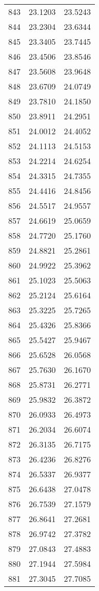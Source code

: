 \documentclass{article}
\begin{document}
\begin{longtable}{|c|c|c|}
843 & 23.1203 & 23.5243 \\
844 & 23.2304 & 23.6344 \\
845 & 23.3405 & 23.7445 \\
846 & 23.4506 & 23.8546 \\
847 & 23.5608 & 23.9648 \\
848 & 23.6709 & 24.0749 \\
849 & 23.7810 & 24.1850 \\
850 & 23.8911 & 24.2951 \\
851 & 24.0012 & 24.4052 \\
852 & 24.1113 & 24.5153 \\
853 & 24.2214 & 24.6254 \\
854 & 24.3315 & 24.7355 \\
855 & 24.4416 & 24.8456 \\
856 & 24.5517 & 24.9557 \\
857 & 24.6619 & 25.0659 \\
858 & 24.7720 & 25.1760 \\
859 & 24.8821 & 25.2861 \\
860 & 24.9922 & 25.3962 \\
861 & 25.1023 & 25.5063 \\
862 & 25.2124 & 25.6164 \\
863 & 25.3225 & 25.7265 \\
864 & 25.4326 & 25.8366 \\
865 & 25.5427 & 25.9467 \\
866 & 25.6528 & 26.0568 \\
867 & 25.7630 & 26.1670 \\
868 & 25.8731 & 26.2771 \\
869 & 25.9832 & 26.3872 \\
870 & 26.0933 & 26.4973 \\
871 & 26.2034 & 26.6074 \\
872 & 26.3135 & 26.7175 \\
873 & 26.4236 & 26.8276 \\
874 & 26.5337 & 26.9377 \\
875 & 26.6438 & 27.0478 \\
876 & 26.7539 & 27.1579 \\
877 & 26.8641 & 27.2681 \\
878 & 26.9742 & 27.3782 \\
879 & 27.0843 & 27.4883 \\
880 & 27.1944 & 27.5984 \\
881 & 27.3045 & 27.7085 \\

\end{longtable}
\end{document}
